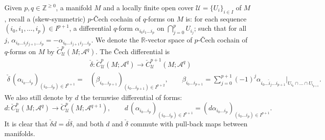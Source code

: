 \documentclass[11pt]{article}
\theoremstyle{definition}
\theoremstyle{remark}
\def\Z{\mathbb{Z}}
\def\R{\mathbb{R}}
\def\cA{\mathcal{A}}
\def\cU{\mathcal{U}}
\begin{document}
\begin{appendices}
Given $p,q\in\Z^{\ge0}$, a manifold $M$ and a locally finite open cover $\cU=\{U_i\}_{i\in I}$ of $M$, recall a (skew-symmetric) $p$-\v{C}ech cochain of $q$-forms on $M$ is: for each sequence $(i_0,i_1,\ldots,i_p)\in I^{p+1}$, a differential $q$-form $\alpha_{i_0i_1\ldots i_p}$ on $\bigcap_{j=0}^pU_{i_j}$; such that for all $j$, 
$\alpha_{i_0\ldots i_ji_{j+1}\ldots i_p}=-\alpha_{i_0\ldots i_{j+1}i_j\ldots i_p}.$
We denote the $\R$-vector space of $p$-\v{C}ech cochain of $q$-forms on $M$ by $\check{C}^p_\cU(M;\cA^q)$. 
The \v{C}ech differential is 
\begin{align*}
&\check\delta:\check{C}^p_\cU(M;\cA^q)\longrightarrow\check{C}^{p+1}_\cU(M;\cA^{q})\\
\check{\delta}\,(\alpha_{i_0\ldots i_p})_{(i_0\ldots i_p)\in I^{p+1}}=&(\beta_{i_0\ldots i_{p+1}})_{(i_0\ldots i_{p+1})\in I^{p+2}},\qquad
\beta_{i_0\ldots i_{p+1}}=\sum_{j=0}^{p+1}(-1)^j\alpha_{i_0\ldots \hat{i}_j\ldots i_{p+1}}\big|_{U_{i_0}\cap\ldots\cap U_{i_{p+1}}}.
\end{align*}
We also still denote by $d$ the termwise differential of forms:  $$d:\check{C}^p_\cU(M;\cA^q)\longrightarrow\check{C}^{p}_\cU(M;\cA^{q+1}),\qquad d\,(\alpha_{i_0\ldots i_p})_{(i_0\ldots i_p)\in I^{p+1}}=(d\alpha_{i_0\ldots i_p})_{(i_0\ldots i_p)\in I^{p+1}}.$$
It is clear that $\check\delta d=d\check\delta$, and both $d$ and $\check\delta$ commute with pull-back maps between manifolds. 


\end{appendices}
\end{document}
